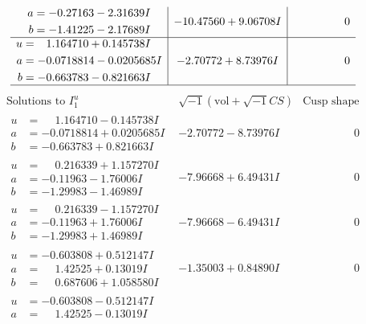 \documentclass[1p]{elsarticle_modified}
\theoremstyle{definition}
\newcommand{\I}{\sqrt{-1}}
\begin{document}
$$\begin{array}{c|c|c}
\begin{aligned}
a &= -0.27163 - 2.31639 I \\
b &= -1.41225 - 2.17689 I\end{aligned}
 & -10.47560 + 9.06708 I & \phantom{-0.000000 } 0 \\ \hline\begin{aligned}
u &= \phantom{-}1.164710 + 0.145738 I \\
a &= -0.0718814 - 0.0205685 I \\
b &= -0.663783 - 0.821663 I\end{aligned}
 & -2.70772 + 8.73976 I & \phantom{-0.000000 } 0\\
 \hline 
 \end{array}$$\newpage$$\begin{array}{c|c|c}  
\text{Solutions to }I^u_{1}& \I (\text{vol} + \sqrt{-1}CS) & \text{Cusp shape}\\
 \hline 
\begin{aligned}
u &= \phantom{-}1.164710 - 0.145738 I \\
a &= -0.0718814 + 0.0205685 I \\
b &= -0.663783 + 0.821663 I\end{aligned}
 & -2.70772 - 8.73976 I & \phantom{-0.000000 } 0 \\ \hline\begin{aligned}
u &= \phantom{-}0.216339 + 1.157270 I \\
a &= -0.11963 - 1.76006 I \\
b &= -1.29983 - 1.46989 I\end{aligned}
 & -7.96668 + 6.49431 I & \phantom{-0.000000 } 0 \\ \hline\begin{aligned}
u &= \phantom{-}0.216339 - 1.157270 I \\
a &= -0.11963 + 1.76006 I \\
b &= -1.29983 + 1.46989 I\end{aligned}
 & -7.96668 - 6.49431 I & \phantom{-0.000000 } 0 \\ \hline\begin{aligned}
u &= -0.603808 + 0.512147 I \\
a &= \phantom{-}1.42525 + 0.13019 I \\
b &= \phantom{-}0.687606 + 1.058580 I\end{aligned}
 & -1.35003 + 0.84890 I & \phantom{-0.000000 } 0 \\ \hline\begin{aligned}
u &= -0.603808 - 0.512147 I \\
a &= \phantom{-}1.42525 - 0.13019 I \\

\end{aligned}
\end{array}$$
\end{document}
